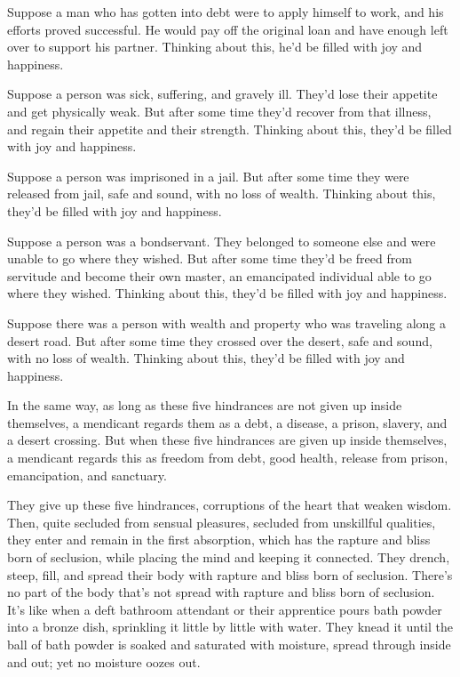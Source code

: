 \documentclass[12pt,openany]{book}%
\begin{document}
Suppose a man who has gotten into debt were to apply himself to work, and his efforts proved successful. He would pay off the original loan and have enough left over to support his partner. Thinking about this, he’d be filled with joy and happiness. 

Suppose a person was sick, suffering, and gravely ill. They’d lose their appetite and get physically weak. But after some time they’d recover from that illness, and regain their appetite and their strength. Thinking about this, they’d be filled with joy and happiness. 

Suppose a person was imprisoned in a jail. But after some time they were released from jail, safe and sound, with no loss of wealth. Thinking about this, they’d be filled with joy and happiness. 

Suppose a person was a bondservant. They belonged to someone else and were unable to go where they wished. But after some time they’d be freed from servitude and become their own master, an emancipated individual able to go where they wished. Thinking about this, they’d be filled with joy and happiness. 

Suppose there was a person with wealth and property who was traveling along a desert road. But after some time they crossed over the desert, safe and sound, with no loss of wealth. Thinking about this, they’d be filled with joy and happiness. 

In the same way, as long as these five hindrances are not given up inside themselves, a mendicant regards them as a debt, a disease, a prison, slavery, and a desert crossing. But when these five hindrances are given up inside themselves, a mendicant regards this as freedom from debt, good health, release from prison, emancipation, and sanctuary. 

They give up these five hindrances, corruptions of the heart that weaken wisdom. Then, quite secluded from sensual pleasures, secluded from unskillful qualities, they enter and remain in the first absorption, which has the rapture and bliss born of seclusion, while placing the mind and keeping it connected. They drench, steep, fill, and spread their body with rapture and bliss born of seclusion. There’s no part of the body that’s not spread with rapture and bliss born of seclusion. It’s like when a deft bathroom attendant or their apprentice pours bath powder into a bronze dish, sprinkling it little by little with water. They knead it until the ball of bath powder is soaked and saturated with moisture, spread through inside and out; yet no moisture oozes out. 
\end{document}
